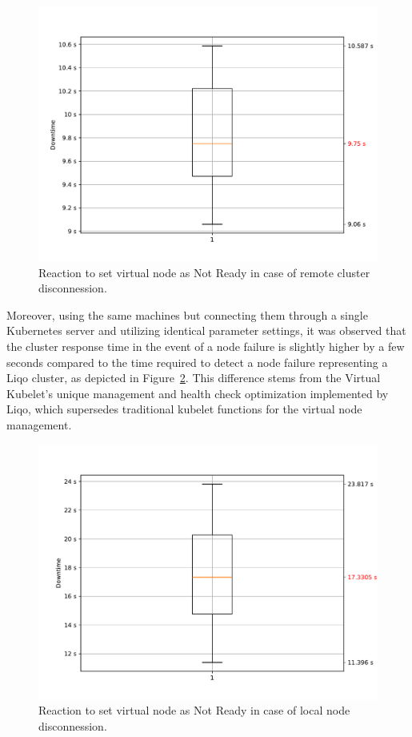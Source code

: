 \begin{figure}[ht]\centering
\includegraphics[scale=0.5]{Pictures/k3s-reaction}
\caption{Reaction to set virtual node as Not Ready in case of remote cluster disconnession.}\label{graph:k-reaction}
\end{figure}

Moreover, using the same machines but connecting them through a single Kubernetes server and utilizing identical parameter settings, it was observed that the cluster response time in the event of a node failure is slightly higher by a few seconds compared to the time required to detect a node failure representing a Liqo cluster, as depicted in Figure~\ref{graph:k-reaction2}. This difference stems from the Virtual Kubelet's unique management and health check optimization implemented by Liqo, which supersedes traditional kubelet functions for the virtual node management.

\begin{figure}[ht]\centering
\includegraphics[scale=0.5]{Pictures/k3s-reaction2}
\caption{Reaction to set virtual node as Not Ready in case of local node disconnession.}\label{graph:k-reaction2}
\end{figure}

